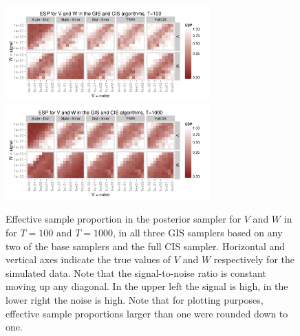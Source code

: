 \documentclass{article}
\begin{document}
\begin{figure}[!ht]
\centering
\includegraphics[width=0.7\textwidth]{plots/intESplot1}
\includegraphics[width=0.7\textwidth]{plots/intESplot2}
\caption{Effective sample proportion in the posterior sampler for $V$ and $W$ in for $T=100$ and $T=1000$, in all three GIS samplers based on any two of the base samplers and the full CIS sampler. Horizontal and vertical axes indicate the true values of $V$ and $W$ respectively for the simulated data. Note that the signal-to-noise ratio is constant moving up any diagonal. In the upper left the signal is high, in the lower right the noise is high. Note that for plotting purposes, effective sample proportions larger than one were rounded down to one.}
\label{intESplot}
\end{figure}
\end{document}
